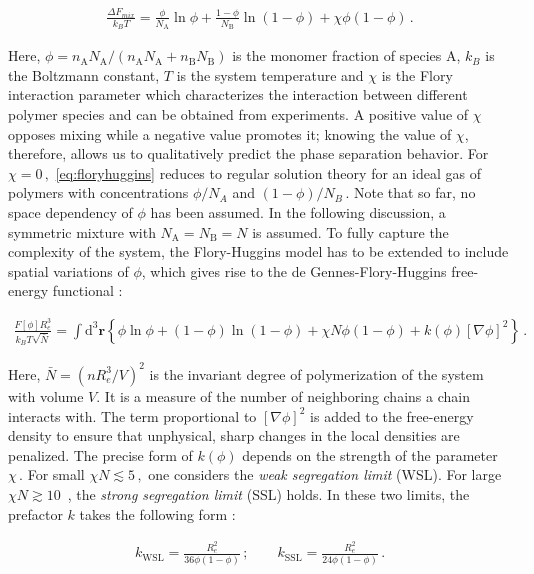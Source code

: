 \documentclass[bachelor,       %
               twoside,        %
               BCOR10mm,       %
               ngerman, english %
               ]{GAUBM}
\begin{document}
\begin{align}
  \frac{\Delta F_{mix}}{k_BT}=\frac{\phi}{N_\mathrm A}\ln\phi+\frac{1-\phi}{N_\mathrm B}\ln(1-\phi)+\chi\phi(1-\phi)\,.
  \label{eq:floryhuggins}
\end{align}

Here, $\phi=n_\mathrm AN_\mathrm A/(n_\mathrm AN_\mathrm A+n_\mathrm BN_\mathrm B)$ is the monomer fraction of species A, $k_B$ is the Boltzmann constant, $T$ is the system temperature and $\chi$ is the Flory interaction parameter which characterizes the interaction between different polymer species and can be obtained from experiments. A positive value of $\chi$ opposes mixing while a negative value promotes it; knowing the value of $\chi$, therefore, allows us to qualitatively predict the phase separation behavior. For $\chi=0\,,$ \eqref{eq:floryhuggins} reduces to regular solution theory for an ideal gas of polymers with concentrations $\phi/N_A$ and $(1-\phi)/N_B\,.$  Note that so far, no space dependency of $\phi$ has been assumed. In the following discussion, a symmetric mixture with $N_\mathrm A=N_\mathrm B=N$ is assumed. To fully capture the complexity of the system, the Flory-Huggins model has to be extended to include spatial variations of $\phi$, which gives rise to the de Gennes-Flory-Huggins free-energy functional  \cite{deGennes80, Reister02}:


\begin{align}
  \frac{F[\phi]R_e^3}{k_BT\sqrt{\bar N}}=\int \mathrm{d}^3\mathbf{r}\left\{\phi\ln\phi+(1-\phi)\ln(1-\phi)+\chi N\phi(1-\phi)+k(\phi)[\nabla\phi]^2\right\}\,.
  \label{eq:flory_fctl}
\end{align}

Here, $\bar N=\left(nR_e^3/V\right)^2$ is the invariant degree of polymerization of the system with volume $V$. It is a measure of the number of neighboring chains a chain interacts with. The term proportional to $[\nabla\phi]^2$ is added to the free-energy density to ensure that unphysical, sharp changes in the local densities are penalized. The precise form of $k(\phi)$ depends on the strength of the parameter $\chi\,$. For small $\chi N\lesssim 5\,,$ one considers the \textit{weak segregation limit} (WSL). For large $\chi N\gtrsim10\,$ \cite{Semenov1996Dec}, the \textit{strong segregation limit} (SSL) holds. In these two limits, the prefactor $k$ takes the following form \cite{Reister02}:

\begin{align}
  k_\mathrm{WSL}=\frac{R_e^2}{36\phi(1-\phi)}\,;\qquad k_\mathrm{SSL}=\frac{R_e^2}{24\phi(1-\phi)}\,.
\end{align}
\end{document}
